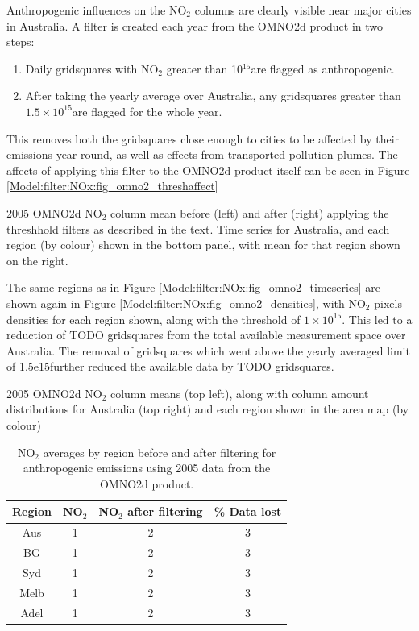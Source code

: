     Anthropogenic influences on the NO$_2$ columns are clearly visible near major cities in Australia.
    A filter is created each year from the OMNO2d product in two steps:
    \begin{enumerate}
      \item Daily gridsquares with NO$_2$ greater than 10$^{15}$\moleccm  are flagged as anthropogenic.
      \item After taking the yearly average over Australia, any gridsquares greater than $1.5 \times 10^{15}$\moleccm are flagged for the whole year.
    \end{enumerate}
    This removes both the gridsquares close enough to cities to be affected by their emissions year round, as well as effects from transported pollution plumes.
    The affects of applying this filter to the OMNO2d product itself can be seen in Figure \ref{Model:filter:NOx:fig_omno2_threshaffect}
    
    {2005 OMNO2d NO$_2$ column mean before (left) and after (right) applying the threshhold filters as described in the text. Time series for Australia, and each region (by colour) shown in the bottom panel, with mean for that region shown on the right.}
    {\label{Model:filter:NOx:fig_omno2_threshaffect}}
    
    The same regions as in Figure \ref{Model:filter:NOx:fig_omno2_timeseries} are shown again in Figure \ref{Model:filter:NOx:fig_omno2_densities}, with NO$_2$ pixels densities for each region shown, along with the threshold of $1 \times 10^{15}$\moleccm.
    This led to a reduction of TODO gridsquares from the total available measurement space over Australia.
    The removal of gridsquares which went above the yearly averaged limit of 1.5e15\moleccm further reduced the available data by TODO gridsquares.
    
    {2005 OMNO2d NO$_2$ column means (top left), along with column amount distributions for Australia (top right) and each region shown in the area map (by colour)}
    {\label{Model:filter:NOx:fig_omno2_densities}}
    
    \begin{table}
      \caption{NO$_2$ averages by region before and after filtering for anthropogenic emissions using 2005 data from the OMNO2d product.}
      \begin{tabular}{ c c c c }
        \hline
        \textbf{Region} & \textbf{NO$_2$} & \textbf{NO$_2$ after filtering} & \textbf{\% Data lost} 
        \\ \hline
        Aus & 1 & 2 & 3 \\
        BG & 1 & 2 & 3 \\
        Syd & 1 & 2 & 3 \\
        Melb & 1 & 2 & 3 \\
        Adel & 1 & 2 & 3 \\
        \hline
      \end{tabular}
      \label{Model:filter:NOx:tab_summary}
    \end{table}
    

